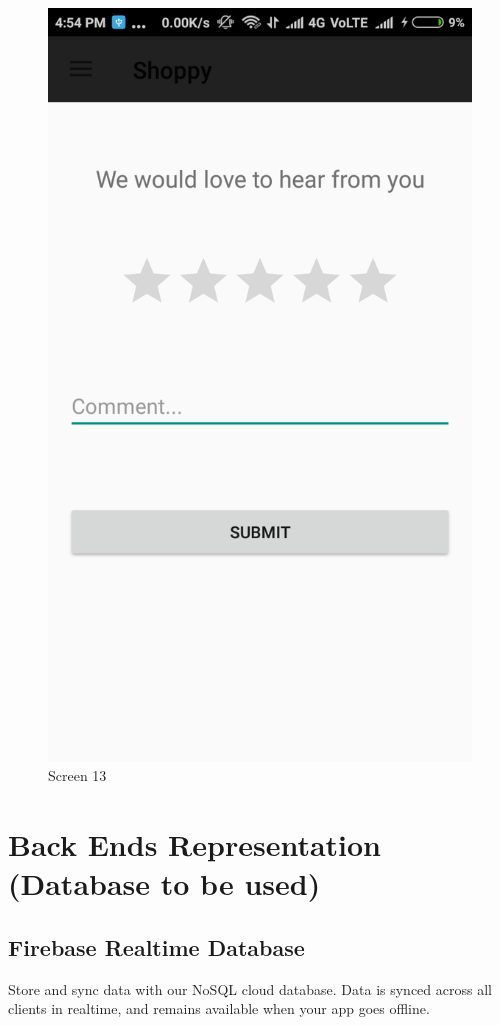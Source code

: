 \begin{figure}[ht]
\centering
\includegraphics[scale=0.30]{images/15.png}
\caption{Screen 13}
\end{figure}

\section{Back Ends Representation (Database to be used)}
\subsection{Firebase Realtime Database}
Store and sync data with our NoSQL cloud database. Data is synced across all clients in realtime, and remains available when your app goes offline.

